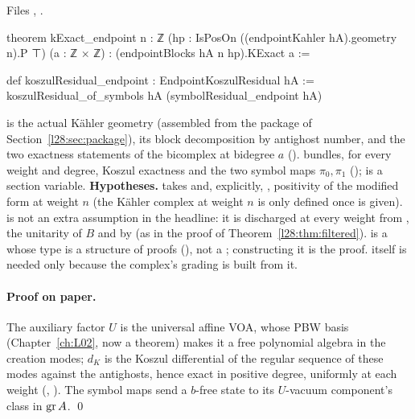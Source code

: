 \noindent Files , .
\begin{leancode}
theorem kExact_endpoint {n : ℤ} (hp : IsPosOn ((endpointKahler hA).geometry n).P ⊤)
    (a : ℤ × ℤ) : (endpointBlocks hA n hp).KExact a :=

def koszulResidual_endpoint : EndpointKoszulResidual hA :=
  koszulResidual_of_symbols hA (symbolResidual_endpoint hA)
\end{leancode}

\begin{dictionary}
 is the actual Kähler geometry (assembled from the package of Section~\ref{l28:sec:package}), 
its block decomposition by antighost number, and  the two exactness statements of the bicomplex at bidegree $a$
().  bundles, for every weight and degree, Koszul exactness and the two symbol
maps $\pi_0,\pi_1$ ();  is a section variable. \textbf{Hypotheses.} 
takes  and, explicitly, , positivity of the modified form at weight $n$ (the
Kähler complex at weight $n$ is only defined once  is given).  is not an extra assumption in the headline: it is discharged at
every weight from , the unitarity of $B$ and  by  (as in the proof of
Theorem~\ref{l28:thm:filtered}).  is a  whose type is a structure of proofs (),
not a ; constructing it is the proof.  itself is needed only because the complex's grading is built from it.
\end{dictionary}

\paragraph{Proof on paper.} The auxiliary factor $U$ is the universal affine VOA, whose PBW basis (Chapter~\ref{ch:L02}, now a theorem) makes it a free
polynomial algebra in the creation modes; $d_K$ is the Koszul differential of the regular sequence of these modes against the antighosts, hence exact
in positive degree, uniformly at each weight (, ). The symbol maps send a
$b$-free state to its $U$-vacuum component's class in $\operatorname{gr} A$. \qed

